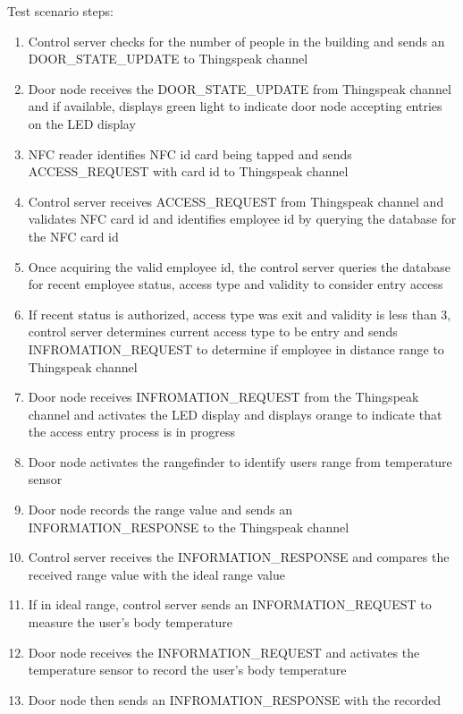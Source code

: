 \noindent
Test scenario steps:
\begin{enumerate}
    \item Control server checks for the number of people in the building and
          sends an DOOR\_STATE\_UPDATE to Thingspeak channel
    \item Door node receives the DOOR\_STATE\_UPDATE from Thingspeak channel and
          if available, displays green light to indicate door node accepting
          entries on the LED display
    \item NFC reader identifies NFC id card being tapped and sends
          ACCESS\_REQUEST with card id to Thingspeak channel
    \item Control server receives ACCESS\_REQUEST from Thingspeak channel and
          validates NFC card id and identifies employee id by querying the
          database for the NFC card id 
    \item Once acquiring the valid employee id, the control server queries the
          database for recent employee status, access type and validity to
          consider entry access
    \item If recent status is authorized, access type was exit and validity is
          less than 3, control server determines current access type to be entry
          and sends INFROMATION\_REQUEST to determine if employee in distance
          range to Thingspeak channel
    \item Door node receives INFROMATION\_REQUEST from the Thingspeak channel
          and activates the LED display and displays orange to indicate that the
          access entry process is in progress 
    \item Door node activates the rangefinder to identify users range from
          temperature sensor
    \item Door node records the range value and sends an INFORMATION\_RESPONSE
          to the Thingspeak channel
    \item Control server receives the INFORMATION\_RESPONSE and compares the
          received range value with the ideal range value
    \item If in ideal range, control server sends an INFORMATION\_REQUEST to
          measure the user’s body temperature
    \item Door node receives the INFORMATION\_REQUEST and activates the
          temperature sensor to record the user’s body temperature 
    \item Door node then sends an INFROMATION\_RESPONSE with the recorded

\end{enumerate}
